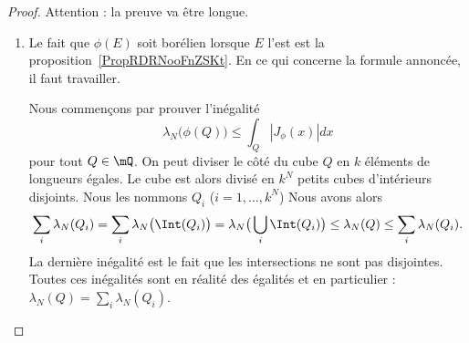 \begin{proof}
	Attention : la preuve va être longue.
	\begin{enumerate}
		\item
		      Le fait que \( \phi(E)\) soit borélien lorsque \( E\) l'est est la proposition~\ref{PropRDRNooFnZSKt}. En ce qui concerne la formule annoncée, il faut travailler.
		      \begin{subproof}
			      Nous commençons par prouver l'inégalité
			      \begin{equation}        \label{EqooQCXXooSjGzks}
				      \lambda_N\big( \phi(Q) \big)\leq \int_Q| J_{\phi}(x) |dx
			      \end{equation}
			      pour tout \( Q\in \mQ\). On peut diviser le côté du cube \( Q\) en \( k\) éléments de longueurs égales. Le cube est alors divisé en \( k^N\) petits cubes d'intérieurs disjoints. Nous les nommons \( Q_i\) (\( i=1,\ldots, k^N\)) Nous avons alors
			      \begin{equation}
				      \sum_i\lambda_N(Q_i)=\sum_i\lambda_N\big( \Int(Q_i) \big)=\lambda_N\big( \bigcup_i\Int(Q_i) \big)\leq \lambda_N(Q)\leq \sum_i\lambda_N(Q_i).
			      \end{equation}
			      La dernière inégalité est le fait que les intersections ne sont pas disjointes. Toutes ces inégalités sont en réalité des égalités et en particulier : \( \lambda_N(Q)=\sum_i\lambda_N(Q_i)\).


\end{subproof}
\end{enumerate}
\end{proof}
